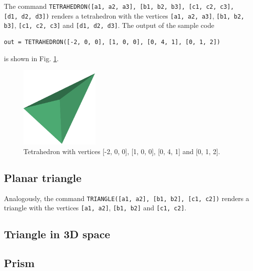 The command {\tt TETRAHEDRON([a1, a2, a3], [b1, b2, b3], [c1, c2, c3], [d1, d2, d3])} renders 
a tetrahedron with the vertices {\tt [a1, a2, a3]}, {\tt [b1, b2, b3]}, {\tt [c1, c2, c3]}
and {\tt [d1, d2, d3]}. The output of the sample code\\

\begin{bbox}
\begin{verbatim}
out = TETRAHEDRON([-2, 0, 0], [1, 0, 0], [0, 4, 1], [0, 1, 2])
\end{verbatim}
\end{bbox}
\vspace{6mm}

\noindent
is shown in Fig. \ref{fig:chull}.

\begin{figure}[!ht]
\begin{center}
\includegraphics[width=0.35\textwidth]{img/chull.png}
\end{center}
\vspace{-4mm}
\caption{Tetrahedron with vertices [-2, 0, 0], [1, 0, 0], [0, 4, 1] and [0, 1, 2].}
\label{fig:chull}
\end{figure}
\noindent

\subsection{Planar triangle}

Analogously, the command {\tt TRIANGLE([a1, a2], [b1, b2], [c1, c2])} renders 
a triangle with the vertices {\tt [a1, a2]}, {\tt [b1, b2]} and {\tt [c1, c2]}. 

\subsection{Triangle in 3D space}


\subsection{Prism}\label{subsec:prism}

